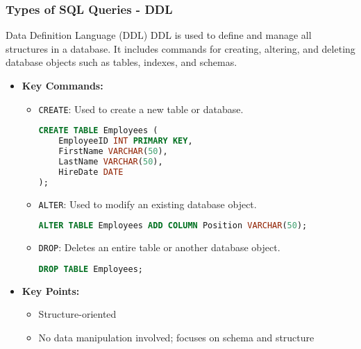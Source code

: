 \documentclass[aspectratio=169]{beamer}
\begin{document}
\begin{frame}[fragile]
    \frametitle{Types of SQL Queries - DDL}
    \begin{block}{Data Definition Language (DDL)}
        DDL is used to define and manage all structures in a database. 
        It includes commands for creating, altering, and deleting database objects such as tables, indexes, and schemas.
    \end{block}
    
    \begin{itemize}
        \item \textbf{Key Commands:}
        \begin{itemize}
            \item \texttt{CREATE}: Used to create a new table or database.
            \begin{lstlisting}[language=SQL]
CREATE TABLE Employees (
    EmployeeID INT PRIMARY KEY,
    FirstName VARCHAR(50),
    LastName VARCHAR(50),
    HireDate DATE
);
            \end{lstlisting}
            
            \item \texttt{ALTER}: Used to modify an existing database object.
            \begin{lstlisting}[language=SQL]
ALTER TABLE Employees ADD COLUMN Position VARCHAR(50);
            \end{lstlisting}
            
            \item \texttt{DROP}: Deletes an entire table or another database object.
            \begin{lstlisting}[language=SQL]
DROP TABLE Employees;
            \end{lstlisting}
        \end{itemize}
        
        \item \textbf{Key Points:}
        \begin{itemize}
            \item Structure-oriented
            \item No data manipulation involved; focuses on schema and structure
        \end{itemize}
    \end{itemize}
\end{frame}
\end{document}
